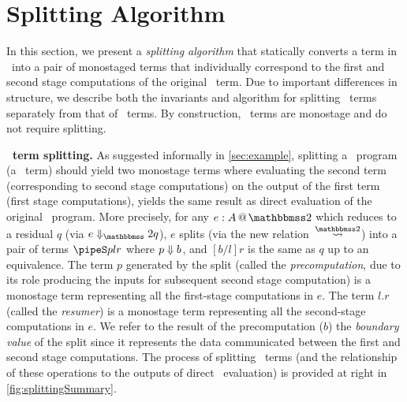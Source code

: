 
\section{Splitting Algorithm}
\label{sec:splitting}



\begin{abstrsyn}


In this section, we present a {\em splitting algorithm} that
statically converts a term in \lang\ into a pair of monostaged terms
that individually correspond to the first and second stage
computations of the original \lang\ term. Due to important differences
in structure, we describe both the invariants and algorithm for
splitting \bbonem\ terms separately from that of \bbtwo\ terms.  By
construction, \bbonep\ terms are monostage and do not require
splitting.

\textbf{\bbtwo\ term splitting.}  As suggested informally in
\ref{sec:example}, splitting a \lang\ program (a \bbtwo\ term) should
yield two monostage terms where evaluating the second term
(corresponding to second stage computations) on the output of the
first term (first stage computations), yields the same result as
direct evaluation of the original \lang\ program.  More precisely, for
any $\coltwo e A$ which reduces to a residual $q$ (via $\diatwo e q$),
$e$ splits (via the new relation~$\splittwosym$) into a pair of terms
$\pipeS p l r$ where ${p} \Downarrow {b}$, and $[b/l]r$ is the same as $q$ up
to an equivalence. The term $p$ generated by the split (called the
{\em precomputation}, due to its role producing the inputs for
subsequent second stage computation) is a monostage term representing
all the first-stage computations in $e$. The term $l.r$ (called the
{\em resumer}) is a monostage term representing all the second-stage
computations in $e$.  We refer to the result of the precomputation
($b$) the {\em boundary value} of the split since it represents the
data communicated between the first and second stage computations.
The process of splitting \bbtwo\ terms (and the relationship of these
operations to the outputs of direct \lang\ evaluation) is provided at
right in \ref{fig:splittingSummary}.



\end{abstrsyn}

